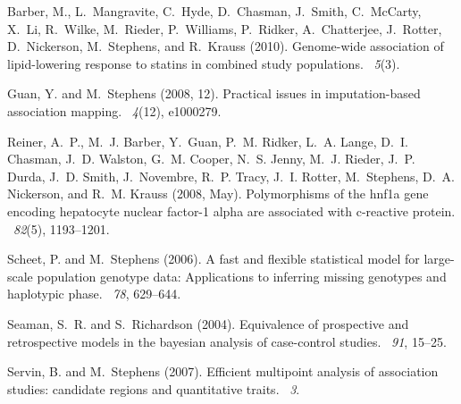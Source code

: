\documentclass[11pt,Palatino]{article}
\begin{document}
\begin{thebibliography}{}

Barber, M., L.~Mangravite, C.~Hyde, D.~Chasman, J.~Smith, C.~McCarty, X.~Li,
  R.~Wilke, M.~Rieder, P.~Williams, P.~Ridker, A.~Chatterjee, J.~Rotter,
  D.~Nickerson, M.~Stephens, and R.~Krauss (2010).
\newblock Genome-wide association of lipid-lowering response to statins in
  combined study populations.
~{\em 5\/}(3).

Guan, Y. and M.~Stephens (2008, 12).
\newblock Practical issues in imputation-based association mapping.
~{\em 4\/}(12), e1000279.

Reiner, A.~P., M.~J. Barber, Y.~Guan, P.~M. Ridker, L.~A. Lange, D.~I. Chasman,
  J.~D. Walston, G.~M. Cooper, N.~S. Jenny, M.~J. Rieder, J.~P. Durda, J.~D.
  Smith, J.~Novembre, R.~P. Tracy, J.~I. Rotter, M.~Stephens, D.~A. Nickerson,
  and R.~M. Krauss (2008, May).
\newblock Polymorphisms of the hnf1a gene encoding hepatocyte nuclear factor-1
  alpha are associated with c-reactive protein.
~{\em 82\/}(5), 1193--1201.

Scheet, P. and M.~Stephens (2006).
\newblock A fast and flexible statistical model for large-scale population
  genotype data: Applications to inferring missing genotypes and haplotypic
  phase.
~{\em 78}, 629--644.

Seaman, S.~R. and S.~Richardson (2004).
\newblock Equivalence of prospective and retrospective models in the bayesian
  analysis of case-control studies.
~{\em 91}, 15--25.

Servin, B. and M.~Stephens (2007).
\newblock Efficient multipoint analysis of association studies: candidate
  regions and quantitative traits.
~{\em 3}.

\end{thebibliography}
\end{document}
